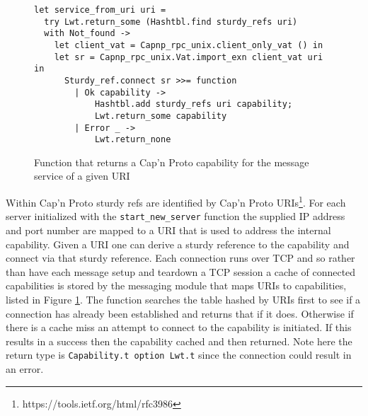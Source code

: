 \begin{figure}
  \begin{lstlisting}
let service_from_uri uri =
  try Lwt.return_some (Hashtbl.find sturdy_refs uri)
  with Not_found ->
    let client_vat = Capnp_rpc_unix.client_only_vat () in
    let sr = Capnp_rpc_unix.Vat.import_exn client_vat uri in
      Sturdy_ref.connect sr >>= function
        | Ok capability ->
            Hashtbl.add sturdy_refs uri capability;
            Lwt.return_some capability
        | Error _ -> 
            Lwt.return_none
  \end{lstlisting}
  \centering
  \caption{Function that returns a Cap'n Proto capability for the message service of a given URI}
  \label{fig:service-from-uri}
\end{figure}

Within Cap'n Proto sturdy refs are identified by Cap'n Proto URIs\footnote{https://tools.ietf.org/html/rfc3986}. For each server initialized with the \texttt{start\_new\_server} function the supplied IP address and port number are mapped to a URI that is used to address the internal capability. Given a URI one can derive a sturdy reference to the capability and connect via that sturdy reference. Each connection runs over TCP and so rather than have each message setup and teardown a TCP session a cache of connected capabilities is stored by the messaging module that maps URIs to capabilities, listed in Figure \ref{fig:service-from-uri}. The function searches the table hashed by URIs first to see if a connection has already been established and returns that if it does. Otherwise if there is a cache miss an attempt to connect to the capability is initiated. If this results in a success then the capability cached and then returned. Note here the return type is \texttt{Capability.t option Lwt.t} since the connection could result in an error. \\

%

